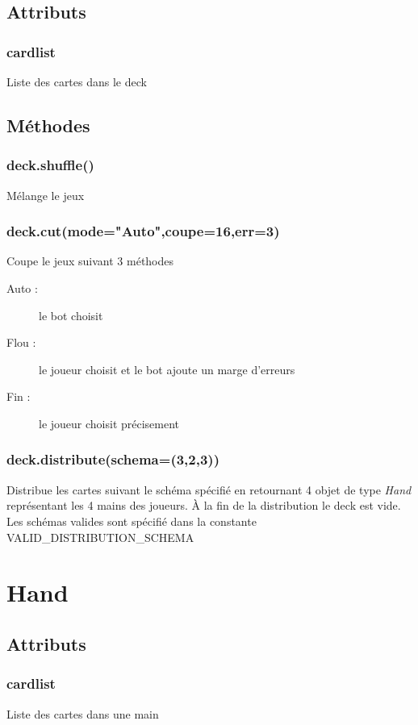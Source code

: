 \documentclass[11pt,oneside,a4paper]{article}
\begin{document}
\subsection{Attributs}
	\subsubsection{cardlist} Liste des cartes dans le deck
	
\subsection{Méthodes}
	\subsubsection{deck.shuffle()} Mélange le jeux
	\subsubsection{deck.cut(mode="Auto",coupe=16,err=3)}
		Coupe le jeux suivant 3 méthodes
		\begin{description}
			\item[Auto :] le bot choisit
			\item[Flou :] le joueur choisit et le bot ajoute un marge d'erreurs
			\item[Fin  :] le joueur choisit précisement
		\end{description}
	\subsubsection{deck.distribute(schema=(3,2,3))}
		Distribue les cartes suivant le schéma spécifié en retournant 4 objet de type \textit{Hand} représentant les 4 mains des joueurs. \`A la fin de la distribution le deck est vide. Les schémas valides sont spécifié dans la constante VALID\_DISTRIBUTION\_SCHEMA
		
\section{Hand}
\subsection{Attributs}
	\subsubsection{cardlist} Liste des cartes dans une main
\end{document}
